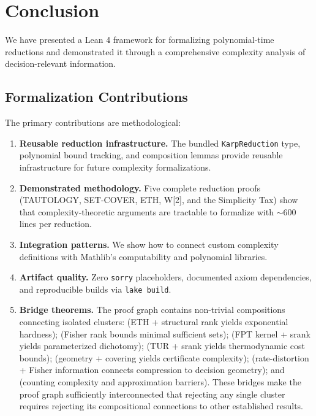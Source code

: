 \section{Conclusion}

We have presented a Lean 4 framework for formalizing polynomial-time reductions and demonstrated it through a comprehensive complexity analysis of decision-relevant information.

\subsection*{Formalization Contributions}

The primary contributions are methodological:

\begin{enumerate}
\item \textbf{Reusable reduction infrastructure.} The bundled \texttt{KarpReduction} type, polynomial bound tracking, and composition lemmas provide reusable infrastructure for future complexity formalizations.

\item \textbf{Demonstrated methodology.} Five complete reduction proofs (TAUTOLOGY, SET-COVER, ETH, W[2], and the Simplicity Tax) show that complexity-theoretic arguments are tractable to formalize with $\sim$600 lines per reduction.

\item \textbf{Integration patterns.} We show how to connect custom complexity definitions with Mathlib's computability and polynomial libraries.

\item \textbf{Artifact quality.} Zero \texttt{sorry} placeholders, documented axiom dependencies, and reproducible builds via \texttt{lake build}.

\item \textbf{Bridge theorems.} The proof graph contains non-trivial compositions connecting isolated clusters:  (ETH + structural rank yields exponential hardness);  (Fisher rank bounds minimal sufficient sets);  (FPT kernel + srank yields parameterized dichotomy);  (TUR + srank yields thermodynamic cost bounds);  (geometry + covering yields certificate complexity);  (rate-distortion + Fisher information connects compression to decision geometry);  and  (counting complexity and approximation barriers). These bridges make the proof graph sufficiently interconnected that rejecting any single cluster requires rejecting its compositional connections to other established results.
\end{enumerate}

